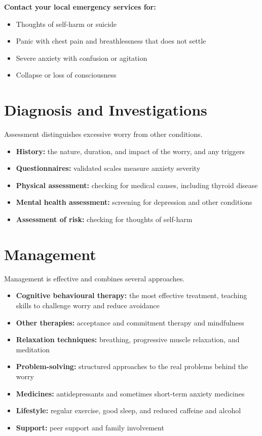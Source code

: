 \textbf{Contact your local emergency services for:}
\begin{itemize}
    \item Thoughts of self-harm or suicide
    \item Panic with chest pain and breathlessness that does not settle
    \item Severe anxiety with confusion or agitation
    \item Collapse or loss of consciousness
\end{itemize}

\section*{Diagnosis and Investigations}
Assessment distinguishes excessive worry from other conditions.
\begin{itemize}
    \item \textbf{History:} the nature, duration, and impact of the worry, and any triggers
    \item \textbf{Questionnaires:} validated scales measure anxiety severity
    \item \textbf{Physical assessment:} checking for medical causes, including thyroid disease
    \item \textbf{Mental health assessment:} screening for depression and other conditions
    \item \textbf{Assessment of risk:} checking for thoughts of self-harm
\end{itemize}

\section*{Management}
Management is effective and combines several approaches.
\begin{itemize}
    \item \textbf{Cognitive behavioural therapy:} the most effective treatment, teaching skills to challenge worry and reduce avoidance
    \item \textbf{Other therapies:} acceptance and commitment therapy and mindfulness
    \item \textbf{Relaxation techniques:} breathing, progressive muscle relaxation, and meditation
    \item \textbf{Problem-solving:} structured approaches to the real problems behind the worry
    \item \textbf{Medicines:} antidepressants and sometimes short-term anxiety medicines
    \item \textbf{Lifestyle:} regular exercise, good sleep, and reduced caffeine and alcohol
    \item \textbf{Support:} peer support and family involvement
\end{itemize}

